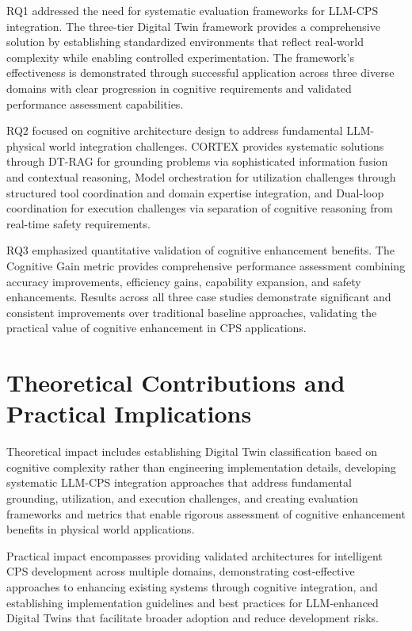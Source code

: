 RQ1 addressed the need for systematic evaluation frameworks for LLM-CPS integration. The three-tier Digital Twin framework provides a comprehensive solution by establishing standardized environments that reflect real-world complexity while enabling controlled experimentation. The framework's effectiveness is demonstrated through successful application across three diverse domains with clear progression in cognitive requirements and validated performance assessment capabilities.

RQ2 focused on cognitive architecture design to address fundamental LLM-physical world integration challenges. CORTEX provides systematic solutions through DT-RAG for grounding problems via sophisticated information fusion and contextual reasoning, Model orchestration for utilization challenges through structured tool coordination and domain expertise integration, and Dual-loop coordination for execution challenges via separation of cognitive reasoning from real-time safety requirements.

RQ3 emphasized quantitative validation of cognitive enhancement benefits. The Cognitive Gain metric provides comprehensive performance assessment combining accuracy improvements, efficiency gains, capability expansion, and safety enhancements. Results across all three case studies demonstrate significant and consistent improvements over traditional baseline approaches, validating the practical value of cognitive enhancement in CPS applications.

\section{Theoretical Contributions and Practical Implications}

Theoretical impact includes establishing Digital Twin classification based on cognitive complexity rather than engineering implementation details, developing systematic LLM-CPS integration approaches that address fundamental grounding, utilization, and execution challenges, and creating evaluation frameworks and metrics that enable rigorous assessment of cognitive enhancement benefits in physical world applications.

Practical impact encompasses providing validated architectures for intelligent CPS development across multiple domains, demonstrating cost-effective approaches to enhancing existing systems through cognitive integration, and establishing implementation guidelines and best practices for LLM-enhanced Digital Twins that facilitate broader adoption and reduce development risks.

